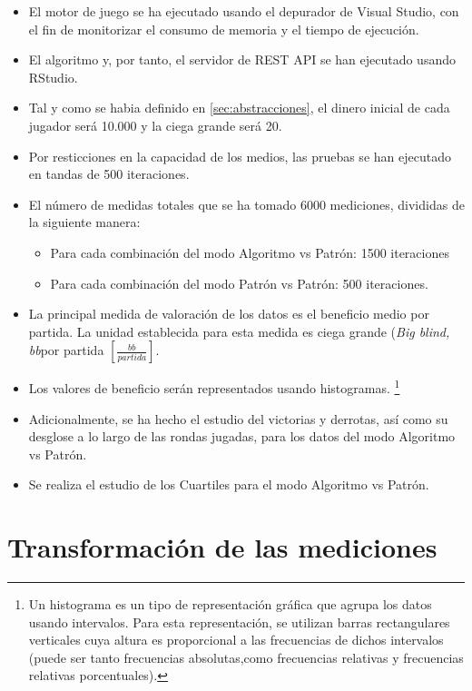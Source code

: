 \begin{itemize}
\item El motor de juego se ha ejecutado usando el depurador de Visual Studio, con el fin de monitorizar el consumo de memoria y el tiempo de ejecución.
\item El algoritmo y, por tanto, el servidor de REST API se han ejecutado usando RStudio.
\item Tal y como se habia definido en \ref{sec:abstracciones}, el dinero inicial de cada jugador será 10.000 y la ciega grande será 20.
\item Por resticciones en la capacidad de los medios, las pruebas se han ejecutado en tandas de 500 iteraciones.
\item El número de medidas totales que se ha tomado 6000 mediciones, divididas de la siguiente manera:
\begin{itemize}
\item Para cada combinación del modo Algoritmo vs Patrón: 1500 iteraciones
\item Para cada combinación del modo Patrón vs Patrón: 500 iteraciones.
\end{itemize} 
\item La principal medida de valoración de los datos es el beneficio medio por partida. La unidad establecida \cite{chen} para esta medida es ciega grande (\textit{Big blind, bb}por partida $\left[\frac{bb}{partida}\right]$.
\item Los valores de beneficio serán representados usando histogramas. \footnote{Un histograma \cite{histo} es un tipo de representación gráfica que agrupa los datos usando intervalos. Para esta representación, se utilizan barras rectangulares verticales cuya altura es proporcional a las frecuencias de dichos intervalos (puede ser tanto frecuencias absolutas,como frecuencias relativas y frecuencias relativas porcentuales).}
\item Adicionalmente, se ha hecho el estudio del victorias y derrotas, así como su desglose a lo largo de las rondas jugadas, para los datos del modo Algoritmo vs Patrón.
\item Se realiza el estudio de los Cuartiles para el modo Algoritmo vs Patrón.
\end{itemize} 

\section{Transformación de las mediciones}

